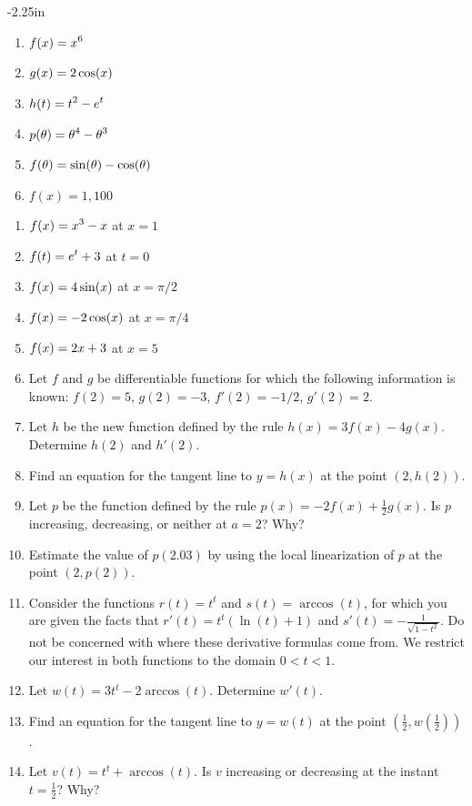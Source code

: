 \begin{adjustwidth*}{}{-2.25in}
\begin{multicols*}{2}
\begin{enumerate}[1),resume]
\item $\displaystyle f(x) = x^6$
\item $\displaystyle g(x) = 2\cos(x)$
\item $\displaystyle h(t) = t^2 - e^t$
\item $\displaystyle p(\theta) = \theta^4-\theta^3$
\item $\displaystyle f(\theta) = \sin(\theta)-\cos(\theta)$
\item $f(x)=1,100$
\end{enumerate}


\begin{enumerate}[1),resume]
\item $\displaystyle f(x)=x^3-x$ at $x=1$
\item $\displaystyle f(t)=e^t+3$ at $t=0$
\item $\displaystyle f(x)=4\sin(x)$ at $x=\pi/2$
\item $\displaystyle f(x)=-2\cos(x)$ at $x=\pi/4$
\item $\displaystyle f(x)=2x+3$ at $x=5$

\item Let $f$ and $g$ be differentiable functions for which the following information is known:  $f(2) = 5$, $g(2) = -3$, $f'(2) = -1/2$, $g'(2) = 2$.
\ba
	\item Let $h$ be the new function defined by the rule $h(x) = 3f(x) - 4g(x)$.  Determine $h(2)$ and $h'(2)$.
	\item Find an equation for the tangent line to $y = h(x)$ at the point $(2,h(2))$.
	\item Let $p$ be the function defined by the rule $p(x) = -2f(x) + \frac{1}{2}g(x)$.  Is $p$ increasing, decreasing, or neither at $a = 2$?  Why?
	\item Estimate the value of $p(2.03)$ by using the local linearization of $p$ at the point $(2,p(2))$.
\ea

\item Consider the functions $r(t) = t^t$ and $s(t) = \arccos(t)$, for which you are given the facts that $r'(t) = t^t(\ln(t) + 1)$ and $s'(t) = -\frac{1}{\sqrt{1-t^2}}$.  Do not be concerned with where these derivative formulas come from.  We restrict our interest in both functions to the domain $0 < t < 1$.
\ba
	\item Let $w(t) = 3t^t - 2\arccos(t)$.  Determine $w'(t)$.
	\item Find an equation for the tangent line to $y = w(t)$ at the point $(\frac{1}{2}, w(\frac{1}{2}))$.
	\item Let $v(t) = t^t + \arccos(t)$.  Is $v$ increasing or decreasing at the instant $t = \frac{1}{2}$?  Why?
\ea


\end{enumerate}
\end{multicols*}
\end{adjustwidth*}
